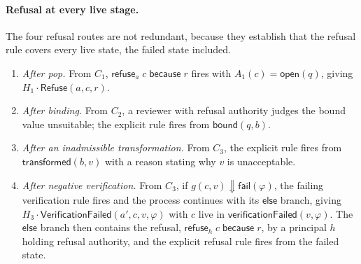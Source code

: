 \documentclass[11pt,openany]{book}
\theoremstyle{remark}
\newcommand{\Refuse}{\mathsf{Refuse}}
\begin{document}
\paragraph{Refusal at every live stage.}
The four refusal routes are not redundant, because they establish that the
refusal rule covers every live state, the failed state included.
\begin{enumerate}[leftmargin=1.5em]
\item \emph{After pop.} From $C_1$, $\mathsf{refuse}_a\;c\;\mathsf{because}\;r$
fires with $A_1(c)=\mathsf{open}(q)$, giving
$H_1\cdot\Refuse(a,c,r)$.
\item \emph{After binding.} From $C_2$, a reviewer with refusal authority
judges the bound value unsuitable; the explicit rule fires from
$\mathsf{bound}(q,b)$.
\item \emph{After an inadmissible transformation.} From $C_3$, the explicit
rule fires from $\mathsf{transformed}(b,v)$ with a reason stating why $v$ is
unacceptable.
\item \emph{After negative verification.} From $C_3$, if
$g(c,v)\Downarrow\mathsf{fail}(\varphi)$, the failing verification rule
fires and the process continues with its $\mathsf{else}$ branch, giving
$H_3\cdot\mathsf{VerificationFailed}(a',c,v,\varphi)$ with $c$ live in
$\mathsf{verificationFailed}(v,\varphi)$. The $\mathsf{else}$ branch then
contains the refusal, $\mathsf{refuse}_h\;c\;\mathsf{because}\;r$, by a
principal $h$ holding refusal authority, and the explicit refusal rule
fires from the failed state.
\end{enumerate}
\end{document}
